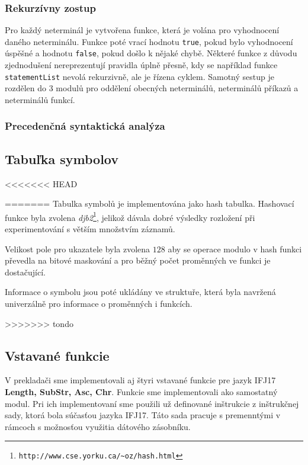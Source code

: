 \documentclass{article}
\begin{document}
            \subsubsection{Rekurzívny zostup}
                Pro každý neterminál je vytvořena funkce, která je volána pro vyhodnocení daného neterminálu.
                Funkce poté vrací hodnotu \texttt{true}, pokud bylo vyhodnocení úspěšné a hodnotu \texttt{false}, pokud došlo k nějaké chybě. Některé funkce z důvodu zjednodušení nereprezentují pravidla úplně přesně, kdy se například funkce \texttt{statementList} nevolá rekurzivně, ale je řízena cyklem. Samotný sestup je rozdělen do 3 modulů pro oddělení obecných neterminálů, neterminálů příkazů a neterminálů funkcí.
            
            \subsubsection{Precedenčná syntaktická analýza}

        \subsection{Tabuľka symbolov}
<<<<<<< HEAD

=======
            Tabulka symbolů je implementována jako hash tabulka. Hashovací funkce byla zvolena \emph{djb2}\footnote{\texttt{http://www.cse.yorku.ca/\~{}oz/hash.html}}, jelikož dávala dobré výsledky rozložení při experimentování s větším množstvím záznamů.
            
            Velikost pole pro ukazatele byla zvolena $128$ aby se operace modulo v hash funkci převedla na bitové maskování a pro běžný počet proměnných ve funkci je dostačující.
            
            Informace o symbolu jsou poté ukládány ve struktuře, která byla navržená univerzálně pro informace o proměnných i funkcích.
        
>>>>>>> tondo
        \subsection{Vstavané funkcie}
            V prekladači sme implementovali aj štyri vstavané funkcie pre jazyk IFJ17 \textbf{Length, SubStr, Asc, Chr}.
            Funkcie sme implementovali ako samostatný modul. Pri ich implementovaní sme použili už definované
            inštrukcie z inštrukčnej sady, ktorá bola súčasťou jazyka IFJ17. Táto sada pracuje s premenntými v rámcoch
            s možnosťou využitia dátového zásobníku.
\end{document}
